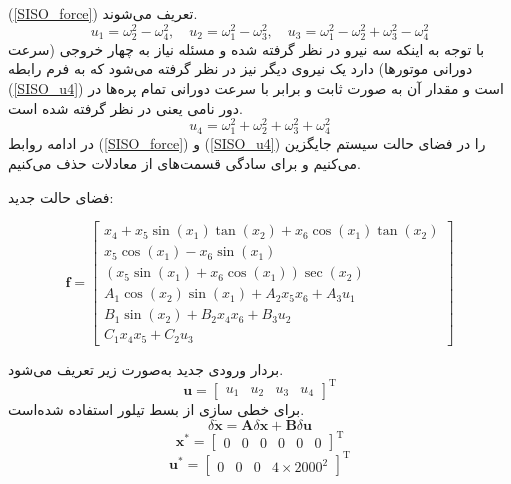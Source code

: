 (\ref{SISO_force})
تعریف می‌شوند.
\begin{equation}\label{SISO_force}
	u_1 = \omega_2^2 - \omega_4^2, \quad
	u_2 = \omega_1^2 - \omega_3^2, \quad
	u_3 = \omega_1^2 - \omega_2^2  + \omega_3^2 - \omega_4^2
\end{equation}
با توجه به اینکه سه نیرو در نظر گرفته ‌شده و مسئله نیاز به چهار خروجی (سرعت دورانی موتورها) دارد یک نیروی دیگر نیز در نظر گرفته ‌می‌شود که به فرم رابطه 
(\ref{SISO_u4})
است و مقدار آن به صورت ثابت و برابر با سرعت دورانی تمام پره‌ها در دور نامی یعنی
در نظر گرفته ‌شده ‌است.
\begin{equation}\label{SISO_u4}
	u_4 = \omega_1^2 + \omega_2^2  + \omega_3^2 + \omega_4^2
\end{equation}
در ادامه روابط 
(\ref{SISO_force})
و
(\ref{SISO_u4})
را در فضای حالت سیستم جایگزین می‌کنیم و برای سادگی قسمت‌های 
از معادلات حذف می‌کنیم.

فضای حالت جدید:

\begin{equation}
	\boldsymbol f = \begin{bmatrix}
		x_4 + x_5\sin(x_1)\tan(x_2) + x_6\cos(x_1)\tan(x_2)\\
		x_5\cos(x_1)- x_6\sin(x_1)\\
		(x_5\sin(x_1) + x_6\cos(x_1))\sec(x_2)\\
		A_1\cos(x_2)\sin(x_1) + 
		A_2x_5x_6 + A_3u_1
		\\
		B_1\sin(x_2) + 
		B_2x_4x_6 + B_3u_2\\
		C_1x_4x_5 + 
		C_2u_3
	\end{bmatrix}
\end{equation} 

بردار ورودی جدید به‌صورت زیر تعریف می‌شود.
\begin{equation}
	\boldsymbol{u} = \begin{bmatrix}
		u_1&u_2&u_3&u_4
	\end{bmatrix}^\mathrm{T}
\end{equation}
برای خطی سازی از بسط تیلور استفاده شده‌است.
\begin{equation}
	\delta \dot{\boldsymbol{x}} = \boldsymbol{A}\delta \boldsymbol x + \boldsymbol{B}\delta \boldsymbol u 
\end{equation}
\begin{equation}
	\boldsymbol{x^*} = \begin{bmatrix} %
		0& 0 & 0 & 0& 0& 0
	\end{bmatrix}^\mathrm{T}
\end{equation}
\begin{equation}
	\boldsymbol{u^*} = \begin{bmatrix}
		0&0&0&4\times2000^2
	\end{bmatrix}^\mathrm{T}
\end{equation}


